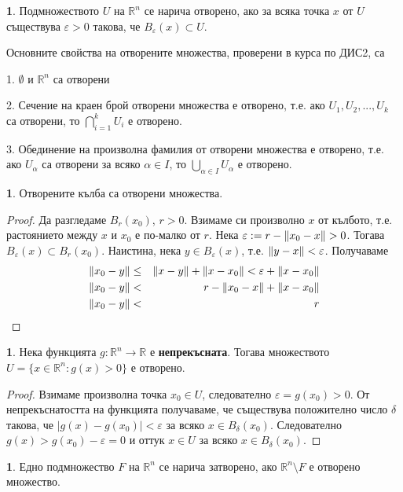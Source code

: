 \documentclass[11pt]{article}
\numberwithin{equation}{section}
\numberwithin{figure}{section}
\numberwithin{table}{section}
\theoremstyle{plain}
\theoremstyle{definition}
\newtheorem{defn}[thm]{\protect\definitionname}
\theoremstyle{remark}
\theoremstyle{definition}
\theoremstyle{remark}
\theoremstyle{plain}
\theoremstyle{definition}
\theoremstyle{definition}
\newtheorem{example}[thm]{\protect\examplename}
\theoremstyle{plain}
\theoremstyle{plain}
\theoremstyle{plain}
\theoremstyle{definition}
\theoremstyle{plain}
\providecommand{\definitionname}{Дефиниция}
\providecommand{\examplename}{Пример}
\DeclarePairedDelimiter\norm{\lVert}{\rVert}
\newcommand*{\R}{\mathbb{R}}
\begin{document}
\begin{defn}
Подмножеството $U$ на $\R^n$ се нарича отворено, ако за всяка точка $x$ от $U$ съществува $\varepsilon>0$ такова, че $B_\varepsilon (x) \subset U$.
\end{defn}

Основните свойства на отворените множества, проверени в курса по ДИС2, са

1. $\emptyset$ и $\R^n$ са отворени

2. Сечение на краен брой отворени множества е отворено, т.е. ако $U_1, U_2, ..., U_k$ са отворени, то $\bigcap_{i=1}^k U_i$ е отворено.

3. Обединение на произволна фамилия от отворени множества е отворено, т.е. ако $U_\alpha$ са отворени за всяко $\alpha \in I$, то $\bigcup _{\alpha \in I} U_\alpha$ е отворено.

\begin{example}
Отворените кълба са отворени множества.
\begin{proof}
Да разгледаме $B_r(x_0)$, $r>0$. Взимаме си произволно $x$ от кълбото, т.е. растоянието между $x$ и $x_0$ е по-малко от $r$. Нека $\varepsilon := r - \norm{x_0-x}>0$. Тогава $B_\varepsilon(x)\subset B_r(x_0)$. Наистина, нека $y\in B_\varepsilon(x)$, т.е. $\norm{y-x} <\varepsilon$. Получаваме
\begin{eqnarray*}
\norm{x_0-y} &\leq& \norm{x-y} + \norm{x-x_0} < \varepsilon + \norm{x-x_0}\\
\norm{x_0-y} &<& r - \norm{x_0-x} + \norm{x-x_0}\\
\norm{x_0-y} &<& r
\end{eqnarray*}
\end{proof}
\end{example}

\begin{example}
Нека функцията  $g:\R^n \rightarrow \R$ е \textbf{непрекъсната}. Тогава множеството \\ $U = \{x\in\R^n:g(x)>0\}$ е отворено.
\begin{proof}
Взимаме произволна точка $x_0\in U$, следователно $\varepsilon = g(x_0)>0$. От непрекъснатостта на функцията получаваме, че съществува положително число $\delta$ такова, че $|g(x)-g(x_0)|<\varepsilon$ за всяко $x\in B_\delta(x_0)$. Следователно $g(x)>g(x_0)-\varepsilon = 0$ и оттук $x \in U$ за всяко $x\in B_\delta(x_0)$.
\end{proof}
\end{example}

\begin{defn} Едно подмножество
$F$ на $\R^n $ се нарича затворено, ако $\R^n \setminus F$ е отворено множество.
\end{defn}
\end{document}
